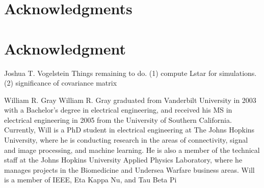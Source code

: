 \documentclass[10pt,journal,cspaper,compsoc]{IEEEtran}
\begin{document}
% 

\ifCLASSOPTIONcompsoc
  \section*{Acknowledgments}
\else
  \section*{Acknowledgment}
\fi


\ifCLASSOPTIONcaptionsoff
  \newpage
\fi





\begin{IEEEbiography}{Joshua T. Vogelstein}
Things remaining to do.  
(1) compute Lstar for simulations.  
(2) significance of covariance matrix

\end{IEEEbiography}

\begin{IEEEbiographynophoto}{William R. Gray}
William R. Gray graduated from Vanderbilt University in 2003 with a Bachelor’s degree in electrical engineering, and received his MS in electrical engineering in 2005 from the University of Southern California.  Currently, Will is a PhD student in electrical engineering at The Johns Hopkins University, where he is conducting research in the areas of connectivity, signal and image processing, and machine learning.  He is also a member of the technical staff at the Johns Hopkins University Applied Physics Laboratory, where he manages projects in the Biomedicine and Undersea Warfare business areas.  Will is a member of IEEE, Eta Kappa Nu, and Tau Beta Pi
\end{IEEEbiographynophoto}
\end{document}
